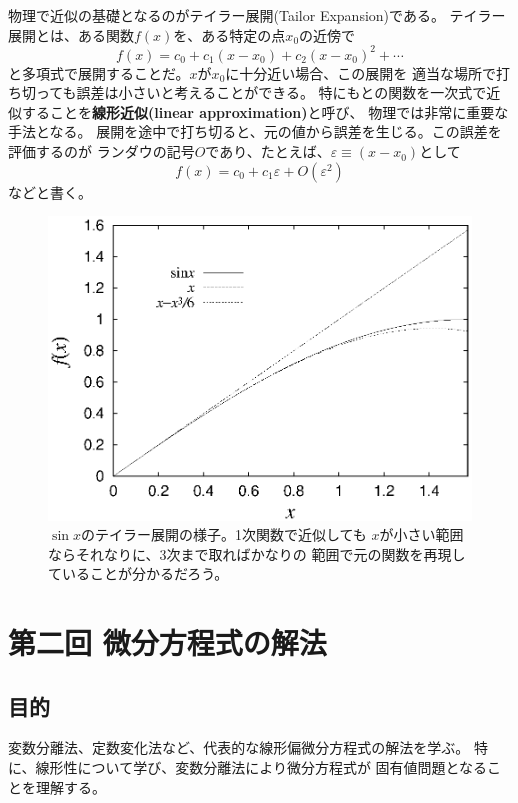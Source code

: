 \documentclass{jarticle}
\begin{document}
物理で近似の基礎となるのがテイラー展開(Tailor Expansion)である。
テイラー展開とは、ある関数$f(x)$を、ある特定の点$x_0$の近傍で
\begin{equation}
  f(x) = c_0 + c_1 (x-x_0) + c_2 (x-x_0)^2 + \cdots
\end{equation}
と多項式で展開することだ。$x$が$x_0$に十分近い場合、この展開を
適当な場所で打ち切っても誤差は小さいと考えることができる。
特にもとの関数を一次式で近似することを{\bf 線形近似(linear approximation)}と呼び、
物理では非常に重要な手法となる。
展開を途中で打ち切ると、元の値から誤差を生じる。この誤差を評価するのが
ランダウの記号$O$であり、たとえば、$\varepsilon \equiv (x-x_0)$として
\begin{equation}
  f(x) = c_0 + c_1 \varepsilon + O(\varepsilon^2)
\end{equation}
などと書く。


\begin{figure}[tb]
  \begin{center}
    \includegraphics[width=.5\linewidth]{fig/pi_tailor.eps}
  \end{center}
  \caption{
    $\sin x$のテイラー展開の様子。1次関数で近似しても
    $x$が小さい範囲ならそれなりに、3次まで取ればかなりの
    範囲で元の関数を再現していることが分かるだろう。
  }
\end{figure}

\newpage
\section{第二回 微分方程式の解法}

\subsection{目的}
変数分離法、定数変化法など、代表的な線形偏微分方程式の解法を学ぶ。
特に、線形性について学び、変数分離法により微分方程式が
固有値問題となることを理解する。
\end{document}
